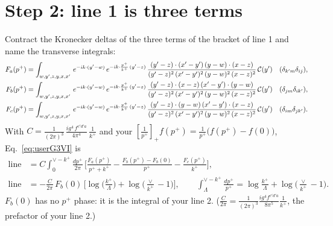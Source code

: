 \documentclass[10pt]{article}
\numberwithin{equation}{section}
\begin{document}
\section{Step 2: line 1 is three terms}
Contract the Kronecker deltas of the three terms of the bracket of line 1 and name the transverse integrals:
\begin{align}
F_a(p^+)&=\int_{w,y',z,y,x,x'}\,e^{-ik\cdot (y'-w)}\, e^{-ik\cdot \frac{p^{+}}{k^{+}}\,(y'-z)}\,\frac{(y'-z)\cdot (x'-y')\,(y-w)\cdot (x-z)}{(y'-z)^{2}\,(x'-y')^{2}\,(y-w)^{2}\,(x-z)^{2}}\,\mathcal C(y') &&(\delta_{k'm}\delta_{ij}),\notag\\
F_b(p^+)&=\int_{w,y',z,y,x,x'}\,e^{-ik\cdot (y'-w)}\, e^{-ik\cdot \frac{p^{+}}{k^{+}}\,(y'-z)}\,\frac{(y'-z)\cdot (x-z)\,(x'-y')\cdot (y-w)}{(y'-z)^{2}\,(x'-y')^{2}\,(y-w)^{2}\,(x-z)^{2}}\,\mathcal C(y') &&(\delta_{jm}\delta_{ik'}),\notag\\
F_c(p^+)&=\int_{w,y',z,y,x,x'}\,e^{-ik\cdot (y'-w)}\, e^{-ik\cdot \frac{p^{+}}{k^{+}}\,(y'-z)}\,\frac{(y'-z)\cdot (y-w)\,(x'-y')\cdot (x-z)}{(y'-z)^{2}\,(x'-y')^{2}\,(y-w)^{2}\,(x-z)^{2}}\,\mathcal C(y') &&(\delta_{im}\delta_{jk'}).
\label{eq:F}
\end{align}
With $C=\frac{1}{(2\pi)^{3}}\, \frac{ig^{4}\,f^{c'd'a}}{4\pi^{4}}\, \frac{1}{k^{+}}$ and your $\left[\frac{1}{p^+}\right]_+f(p^+)=\frac{1}{p^+}\big(f(p^+)-f(0)\big)$, Eq.~\eqref{eq:userG3VI} is
\begin{align}
\text{line 1}&=C\int_{0}^{\vee-k^{+}}\frac{dp^{+}}{2\pi}\,\bigg[\frac{F_a(p^+)}{p^++k^+}-\frac{F_b(p^+)-F_b(0)}{p^+}-\frac{F_c(p^+)}{k^+}\bigg],\label{eq:line1}\\
\text{line 2}&=-\frac{C}{2\pi}\,F_b(0)\,\bigg[\log\Big(\frac{k^+}{\Lambda}\Big)+\log\Big(\frac{\vee}{k^+}-1\Big)\bigg],\qquad \int_\Lambda^{\vee-k^+}\frac{dp^+}{p^+}=\log\frac{k^+}{\Lambda}+\log\Big(\frac{\vee}{k^+}-1\Big).\label{eq:line2}
\end{align}
$F_b(0)$ has no $p^+$ phase: it is the integral of your line 2. ($\frac{C}{2\pi}=\frac{1}{(2\pi)^{3}}\frac{ig^{4}f^{c'd'a}}{8\pi^{5}}\frac{1}{k^{+}}$, the prefactor of your line 2.)
\end{document}
